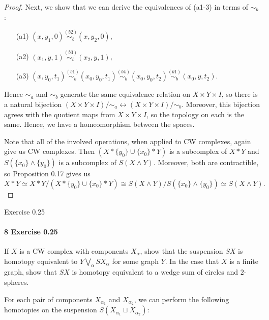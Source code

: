 \documentclass[12pt]{article}
\newlength{\myparskip}
\newenvironment{fullbox}{\begin{lrbox}{\savefullbox}\begin{minipage}{\dimexpr\textwidth-2\fboxsep\relax}\setlength{\parskip}{\myparskip}}{\end{minipage}\end{lrbox}\framebox[\textwidth]{\usebox{\savefullbox}}}
\newenvironment{pbox}[1][]{\begin{fullbox}\ifx#1\empty\else\paragraph{#1}\phantom{}\fi}{\end{fullbox}}
\theoremstyle{definition}
\newcommand{\<}{\langle}
\renewcommand{\>}{\rangle}
\newcommand{\isom}{\cong}
\newcommand{\htpy}{\simeq}
\begin{document}
\begin{proof}
    Next, we show that we can derive the equivalences of (a1-3) in terms of $\sim_b$:
    \begin{enumerate}
        \item[(a1)] $(x, y_1, 0) \overset{(b2)}{\sim_b} (x, y_2, 0)$,
        \item[(a2)] $(x_1, y, 1) \overset{(b3)}{\sim_b} (x_2, y, 1)$,
        \item[(a3)] $(x, y_0, t_1) \overset{(b1)}{\sim_b} (x_0, y_0, t_1) \overset{(b4)}{\sim_b} (x_0, y_0, t_2) \overset{(b1)}{\sim_b} (x_0, y, t_2)$.
    \end{enumerate}

    Hence $\sim_a$ and $\sim_b$ generate the same equivalence relation on $X \times Y \times I$, so there is a natural bijection $(X \times Y \times I)/\sim_a \leftrightarrow (X \times Y \times I)/\sim_b$.
    Moreover, this bijection agrees with the quotient maps from $X \times Y \times I$, so the topology on each is the same.
    Hence, we have a homeomorphism between the spaces.

    Note that all of the involved operations, when applied to CW complexes, again give us CW complexes.
    Then $(X * \{y_0\} \cup \{x_0\} * Y)$ is a subcomplex of $X * Y$ and $S(\{x_0\} \wedge \{y_0\})$ is a subcomplex of $S(X \wedge Y)$.
    Moreover, both are contractible, so Proposition 0.17 gives us
    \[
        X * Y
            \htpy X * Y / (X * \{y_0\} \cup \{x_0\} * Y)
            \isom S(X \wedge Y) / S(\{x_0\} \wedge \{y_0\})
            \htpy S(X \wedge Y).
    \]
\end{proof}


\begin{pbox}[8 Exercise 0.25]
    If $X$ is a CW complex with components $X_\alpha$, show that the suspension $SX$ is homotopy equivalent to $Y \bigvee_\alpha SX_\alpha$ for some graph $Y$.
    In the case that $X$ is a finite graph, show that $SX$ is homotopy equivalent to a wedge sum of circles and $2$-spheres.
\end{pbox}

For each pair of components $X_{\alpha_1}$ and $X_{\alpha_2}$, we can perform the following homotopies on the suspension $S(X_{\alpha_1} \sqcup X_{\alpha_2})$:
\end{document}
